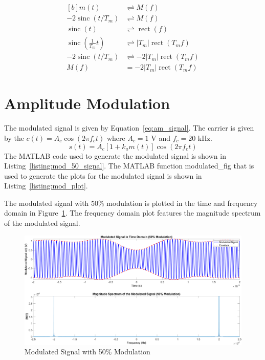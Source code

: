 \documentclass[12pt]{article}
\DeclareMathOperator{\sinc}{sinc}
\DeclareMathOperator{\rect}{rect}
\begin{document}
\begin{equation} \label{eq:message_calc}
\begin{aligned}[b]
    m(t) &\rightleftharpoons M(f) \\
    -2\sinc(t/T_m) &\rightleftharpoons M(f) \\
    \sinc(t) &\rightleftharpoons \rect(f) \\
    \sinc\left(\frac{1}{T_m} t\right) &\rightleftharpoons \left|T_m\right|\rect(T_m f) \\
    -2\sinc(t/T_m) &\rightleftharpoons -2\left|T_m\right|\rect(T_m f) \\
    M(f) &= -2\left|T_m\right|\rect(T_m f)
\end{aligned}
\end{equation}

\section*{Amplitude Modulation}
The modulated signal is given by Equation~\ref{eq:am_signal}. The carrier is given by the $c(t) = A_c \cos(2\pi f_c t)$ where $A_c = 1$ V and $f_c = 20$ kHz. 
\begin{equation} \label{eq:am_signal}
    s(t) = A_c \left[ 1 + k_a m(t) \right] \cos(2\pi f_c t)
\end{equation}
The MATLAB code used to generate the modulated signal is shown in Listing~\ref{listing:mod_50_signal}. The MATLAB function modulated\_fig that is used to generate the plots for the modulated signal is shown in Listing~\ref{listing:mod_plot}.


The modulated signal with 50\% modulation is plotted in the time and frequency domain in Figure~\ref{fig:am_signal}. The frequency domain plot features the magnitude spectrum of the modulated signal.
\begin{figure}[h!]
    \centering
    \includegraphics[width=\textwidth]{q2}
    \caption{\label{fig:am_signal}Modulated Signal with 50\% Modulation}
\end{figure}
\end{document}
